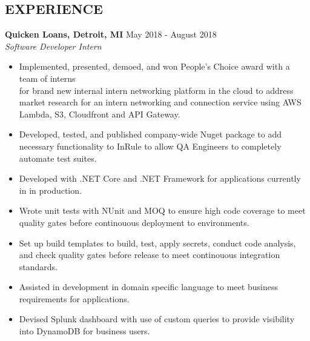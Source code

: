 \documentclass[margin]{res}
\begin{document}
\begin{resume}
\section{EXPERIENCE}
                \textbf{Quicken Loans, Detroit, MI} \hfill May 2018 - August 2018 \\
                {\sl Software Developer Intern}
                \begin{itemize}  \itemsep -2pt %

                  \item Implemented, presented, demoed, and won People's Choice
                   award with a team of interns \\for brand new internal intern
                   networking platform in the cloud to
                   address market research for an intern
                   networking and connection service using
                   AWS Lambda, S3, Cloudfront and API Gateway.

                  \item Developed, tested, and published
                  company-wide Nuget package to add
                  necessary functionality to InRule
                  to allow QA Engineers to completely automate test suites.

                  \item Developed with .NET Core and .NET Framework
                  for applications currently in in production.

                  \item Wrote unit tests with NUnit and MOQ to ensure high code coverage
                  to meet quality gates before continouous deployment
                   to environments.

                  \item Set up build templates to build,
                  test, apply secrets, conduct code analysis,
                  and check quality gates before release to meet
                  continouous integration standards.

                  \item Assisted in development in domain
                  specific language to meet business requirements for applications.

                  \item Devised Splunk dashboard with use of
                  custom queries to provide
                   visibility into DynamoDB for business users.


\end{itemize}
\end{resume}
\end{document}
